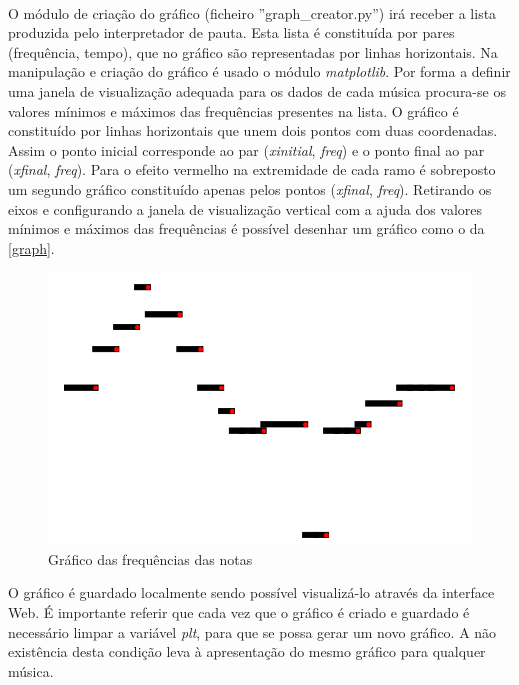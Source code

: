 \documentclass[11pt,openany,twoside]{report}
\begin{document}
\paragraph{ } O módulo de criação do gráfico (ficheiro ”graph\_creator.py”) irá receber a lista produzida pelo  interpretador de pauta. Esta lista é constituída por pares (frequência, tempo), que no gráfico são representadas por linhas horizontais. Na manipulação e criação do gráfico é usado o módulo \textit{matplotlib}. Por forma a definir uma janela de visualização adequada para os dados de cada música procura-se os valores mínimos e máximos das frequências presentes na lista. O gráfico é constituído por linhas horizontais que unem dois pontos com duas coordenadas. Assim o ponto inicial corresponde ao par (\textit{xinitial}, \textit{freq}) e o ponto final ao par (\textit{xfinal}, \textit{freq}). Para o efeito vermelho na extremidade de cada ramo é sobreposto um segundo gráfico constituído apenas pelos pontos (\textit{xfinal}, \textit{freq}). Retirando os eixos e configurando a janela de visualização vertical com a ajuda dos valores mínimos e máximos das frequências é possível desenhar um gráfico como o da \autoref{graph}.
\begin{figure}[h!]
 \center
 \includegraphics[scale=.38]{graph.png}
 \caption{Gráfico das frequências das notas}
 \label{graph}
\end{figure}
O gráfico é guardado localmente sendo possível visualizá-lo através da interface Web.
É importante referir que cada vez que o gráfico é criado e guardado é necessário limpar a variável \textit{plt}, para que se possa gerar um novo gráfico. A não existência desta condição leva à apresentação do mesmo gráfico para qualquer música.

\end{document}
